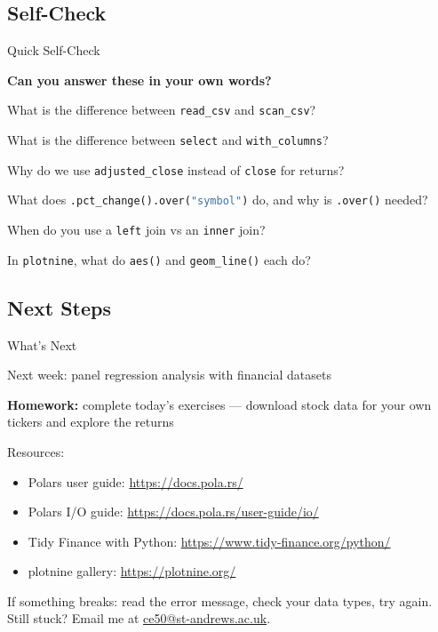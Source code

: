 \documentclass[9pt,aspectratio=169]{beamer}
\newcommand{\py}[1]{\lstinline[language=Python]{#1}}
\begin{document}
\subsection{Self-Check}
\begin{frame}[fragile]{Quick Self-Check}

\textbf{Can you answer these in your own words?}

\be
    \item What is the difference between \py{read_csv} and \py{scan_csv}?
    \item What is the difference between \py{select} and \py{with_columns}?
    \item Why do we use \texttt{adjusted\_close} instead of \texttt{close} for returns?
    \item What does \py{.pct_change().over("symbol")} do, and why is \py{.over()} needed?
    \item When do you use a \texttt{left} join vs an \texttt{inner} join?
    \item In \texttt{plotnine}, what do \texttt{aes()} and \texttt{geom\_line()} each do?
\ee

\end{frame}


\subsection{Next Steps}
\begin{frame}{What's Next}

\bi
    \item Next week: \alert{panel regression analysis} with financial datasets
    \item \textbf{Homework:} complete today's exercises --- download stock data for your own tickers and explore the returns
    \item Resources:
    \begin{itemize}
        \item Polars user guide: \url{https://docs.pola.rs/}
        \item Polars I/O guide: \url{https://docs.pola.rs/user-guide/io/}
        \item Tidy Finance with Python: \url{https://www.tidy-finance.org/python/}
        \item plotnine gallery: \url{https://plotnine.org/}
    \end{itemize}
\ei

\medskip

\begin{highlightbox}
\centering
If something breaks: read the error message, check your data types, try again.\\
Still stuck? Email me at \href{mailto:ce50@st-andrews.ac.uk}{ce50@st-andrews.ac.uk}.
\end{highlightbox}

\end{frame}
\end{document}

